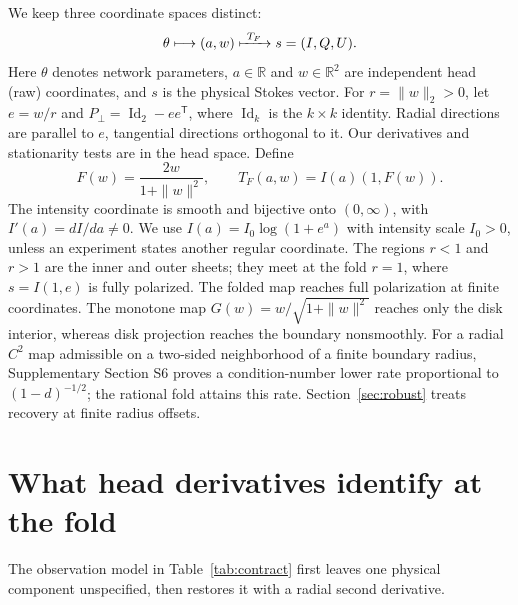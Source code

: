 We keep three coordinate spaces distinct:
\begin{equation}
 \theta\longmapsto(a,w)\xmapsto{\ T_F\ }s=(I,Q,U).
 \label{eq:spaces}
\end{equation}
Here $\theta$ denotes network parameters, $a\in\mathbb R$ and $w\in\mathbb R^2$ are independent head (raw) coordinates, and $s$ is the physical Stokes vector. For $r=\|w\|_2>0$, let $e=w/r$ and $P_\perp=\operatorname{Id}_2-ee^{\mathsf T}$, where $\operatorname{Id}_k$ is the $k\times k$ identity. Radial directions are parallel to $e$, tangential directions orthogonal to it. Our derivatives and stationarity tests are in the head space. Define
\begin{equation}
 F(w)=\frac{2w}{1+\|w\|^2},\qquad
 T_F(a,w)=I(a)(1,F(w)).
 \label{eq:foldmap}
\end{equation}
The intensity coordinate is smooth and bijective onto $(0,\infty)$, with $I'(a)=dI/da\ne0$. We use $I(a)=I_0\log(1+e^a)$ with intensity scale $I_0>0$, unless an experiment states another regular coordinate. The regions $r<1$ and $r>1$ are the inner and outer sheets; they meet at the fold $r=1$, where $s=I(1,e)$ is fully polarized. The folded map reaches full polarization at finite coordinates. The monotone map $G(w)=w/\sqrt{1+\|w\|^2}$ reaches only the disk interior, whereas disk projection reaches the boundary nonsmoothly. For a radial $C^2$ map admissible on a two-sided neighborhood of a finite boundary radius, Supplementary Section S6 proves a condition-number lower rate proportional to $(1-d)^{-1/2}$; the rational fold attains this rate. Section~\ref{sec:robust} treats recovery at finite radius offsets.


\section{What head derivatives identify at the fold}
\label{sec:stationarity}
The observation model in Table~\ref{tab:contract} first leaves one physical component unspecified, then restores it with a radial second derivative.

